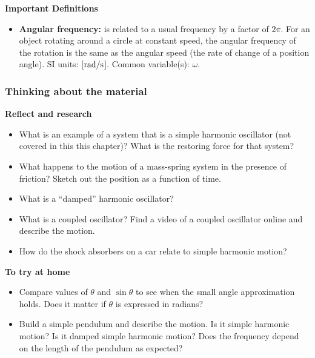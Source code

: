 \begin{framed}
\textbf{Important Definitions}\\
\begin{itemize}
\item \textbf{Angular frequency:} is related to a usual frequency by a factor of $2\pi$. For an object rotating around a circle at constant speed, the angular frequency of the rotation is the same as the angular speed (the rate of change of a position angle). SI units: [${\rm rad/s}$]. Common variable(s): $\omega$.
\end{itemize}
\end{framed}

\subsubsection{Thinking about the material}

\begin{framed}
\textbf{Reflect and research}\\
\begin{itemize}
\item What is an example of a system that is a simple harmonic oscillator (not covered in this this chapter)? What is the restoring force for that system?
\item What happens to the motion of a mass-spring system in the presence of friction? Sketch out the position as a function of time.
\item What is a ``damped'' harmonic oscillator?
\item What is a coupled oscillator? Find a video of a coupled oscillator online and describe the motion.
\item How do the shock absorbers on a car relate to simple harmonic motion?
\end{itemize}
\end{framed}

\begin{framed}
\textbf{To try at home}\\
\begin{itemize}
\item Compare values of $\theta$ and $\sin\theta$ to see when the small angle approximation holds. Does it matter if $\theta$ is expressed in radians?
\item Build a simple pendulum and describe the motion. Is it simple harmonic motion? Is it damped simple harmonic motion? Does the frequency depend on the length of the pendulum as expected?
\end{itemize}
\end{framed}

